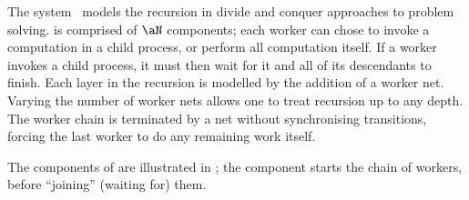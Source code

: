 The \DACSys{\aN} system~\cite{Corbett1996} models the recursion in divide and
conquer approaches to problem solving. \DACSys{\aN} is comprised of $\aN$
\workerC{} components; each worker can chose to invoke a computation in a child
process, or perform all computation itself. If a worker invokes a child
process, it must then wait for it and all of its descendants to finish. Each
layer in the recursion is modelled by the addition of a worker net. Varying the
number of worker nets allows one to treat recursion up to any depth. The worker
chain is terminated by a net without synchronising transitions, forcing the
last worker to do any remaining work itself.

The components of \DACSys{\aN} are illustrated in ;
the \controllerC{} component starts the chain of workers, before ``joining''
(waiting for) them.

